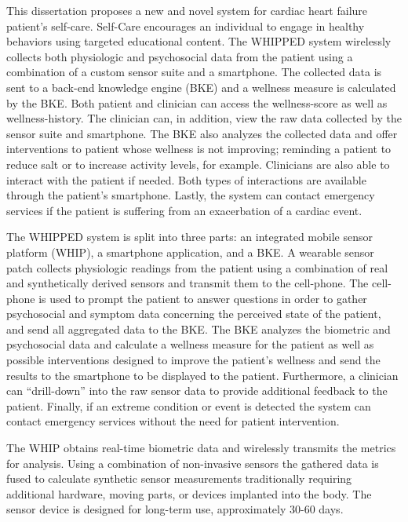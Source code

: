 This dissertation proposes a new and novel system for cardiac heart failure patient's self-care.  Self-Care encourages an individual to engage in healthy behaviors using targeted educational content. The WHIPPED system  wirelessly collects both physiologic and psychosocial data from the patient using a combination of a custom sensor suite and a smartphone. The collected data is sent to a back-end knowledge engine (BKE) and a wellness measure is calculated by the BKE. Both patient and clinician can access the wellness-score as well as wellness-history. The clinician can, in addition, view the raw data collected by the sensor suite and smartphone. The BKE also analyzes the collected data and offer interventions to patient whose wellness is not improving; reminding a patient to reduce salt or to increase activity levels, for example. Clinicians are also able to interact with the patient if needed. Both types of interactions are available through the patient's smartphone. Lastly, the system can contact emergency services if the patient is suffering from an exacerbation of a cardiac event.  

The WHIPPED system is split into three parts: an integrated mobile sensor platform (WHIP), a smartphone application, and a BKE. A wearable sensor patch collects physiologic readings from the patient using a combination of real and synthetically derived sensors and transmit them to the cell-phone. The cell-phone is used to prompt the patient to answer questions in order to gather psychosocial and symptom data concerning the perceived state of the patient, and send all aggregated data to the BKE. The BKE analyzes the biometric and psychosocial data and calculate a wellness measure for the patient as well as possible interventions designed to improve the patient's wellness and send the results to the smartphone to be displayed to the patient. Furthermore, a clinician can “drill-down” into the raw sensor data to provide additional feedback to the patient. Finally, if an extreme condition or event is detected the system can contact emergency services without the need for patient intervention. 

The WHIP obtains real-time biometric data and wirelessly transmits the metrics for analysis. Using a combination of non-invasive sensors the gathered data is fused to calculate synthetic sensor measurements traditionally requiring additional hardware, moving parts, or devices implanted into the body. The sensor device is designed for long-term use, approximately 30-60 days.

